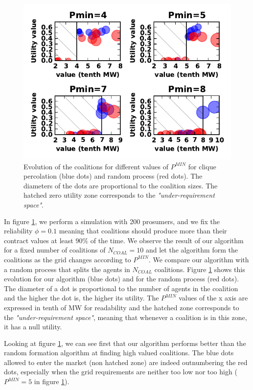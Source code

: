 \documentclass[conference]{IEEEtran}
\begin{document}
\begin{figure}[htbp]
  \centering
  \includegraphics[scale=0.8]{./figure5/coals}
  \caption{Evolution of the coalitions for different values of $ P^{MIN} $ for clique percolation (blue dots) and random process (red dots). The diameters of the dots are proportional to the coalition sizes. The hatched zero utility zone corresponds to the \textit{"under-requirement space"}.}
  \label{Fig3}
\end{figure}

In figure \ref{Fig3}, we perform a simulation with 200 prosumers, and we fix the reliability $ \phi = 0.1 $ meaning that coalitions should produce more than their contract values at least $ 90 \% $ of the time. We observe the result of our algorithm for a fixed number of coalitions of $N_{COAL} = 10$ and let the algorithm form the coalitions as the grid changes according to $ P^{MIN} $. We compare our algorithm with a random process that splits the agents in $ N_{COAL} $ coalitions. Figure \ref{Fig3} shows this evolution for our algorithm (blue dots) and for the random process (red dots). The diameter of a dot is proportional to the number of agents in the coalition and the higher the dot is, the higher its utility. The $ P^{MIN} $ values of the x axis are expressed in tenth of MW for readability and the hatched zone corresponds to the \textit{"under-requirement space"}, meaning that whenever a coalition is in this zone, it has a null utility. 

Looking at figure \ref{Fig3}, we can see first that our algorithm performs better than the random formation algorithm at finding high valued coalitions. The blue dots allowed to enter the market (non hatched zone) are indeed outnumbering the red dots, especially when the grid requirements are neither too low nor too high ($ P^{MIN} = 5 $ in figure \ref{Fig3}).
\end{document}
